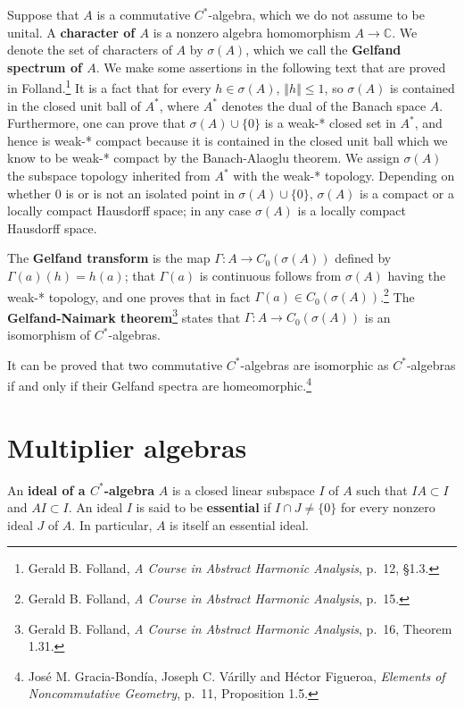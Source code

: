 \documentclass{article}
\newcommand{\norm}[1]{\left\Vert #1 \right\Vert}
\theoremstyle{definition}
\begin{document}
Suppose that $A$ is a commutative $C^*$-algebra, which we do not assume to be unital. A \textbf{character of $A$} is a nonzero algebra homomorphism $A \to \mathbb{C}$. We denote the set of
characters of $A$ by $\sigma(A)$, which we call the \textbf{Gelfand spectrum of $A$}. We make some assertions in the following text
that are proved in Folland.\footnote{Gerald B. Folland, {\em A Course in Abstract Harmonic Analysis}, p.~12, \S 1.3.}
It is a fact that for every $h \in \sigma(A)$, $\norm{h} \leq 1$, so $\sigma(A)$ is contained in the closed unit  ball of $A^*$, where $A^*$
denotes the dual of the Banach space $A$. Furthermore, one can prove that $\sigma(A) \cup \{0\}$ is a weak-* closed set in $A^*$, and hence
is weak-* compact because it is contained in the closed unit ball which we know to be weak-* compact by the Banach-Alaoglu theorem.
We assign $\sigma(A)$ the subspace topology inherited from $A^*$ with the weak-* topology. Depending on whether
$0$ is or is not an isolated point in $\sigma(A) \cup \{0\}$, $\sigma(A)$ is a compact or a locally compact Hausdorff space;  in any case
$\sigma(A)$ is a locally compact Hausdorff space. 

The \textbf{Gelfand transform} is the map $\Gamma:A \to C_0(\sigma(A))$ defined by $\Gamma(a)(h)=h(a)$; 
that $\Gamma(a)$ is continuous follows from $\sigma(A)$ having the weak-* topology, and one
proves that in fact $\Gamma(a) \in C_0(\sigma(A))$.\footnote{Gerald B. Folland, {\em A Course in Abstract Harmonic Analysis}, p.~15.}
The \textbf{Gelfand-Naimark theorem}\footnote{Gerald B. Folland, {\em A Course in Abstract Harmonic Analysis}, p.~16, Theorem 1.31.}
states that $\Gamma:A \to C_0(\sigma(A))$ is an isomorphism of $C^*$-algebras.

It can be proved that two commutative $C^*$-algebras are isomorphic as $C^*$-algebras if and only if their
Gelfand spectra are homeomorphic.\footnote{Jos\'e M. Gracia-Bond\'ia, Joseph C. V\'arilly and
H\'ector Figueroa, {\em Elements of Noncommutative Geometry}, p.~11, Proposition 1.5.}


\section{Multiplier algebras}
An \textbf{ideal of a $C^*$-algebra} $A$ is a closed linear subspace $I$ of $A$ such that $IA \subset I$ and $AI \subset I$.
An ideal $I$ is said to be \textbf{essential} if $I \cap J \neq \{0\}$ for every nonzero ideal $J$ of $A$.
In particular, $A$ is itself an  essential ideal.
\end{document}
